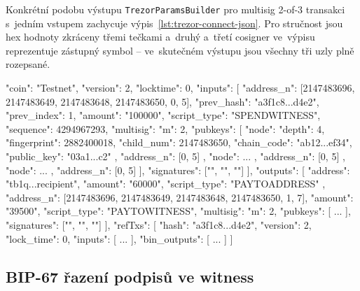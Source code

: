 Konkrétní podobu výstupu \texttt{TrezorParamsBuilder} pro multisig
2-of-3 transakci s~jedním vstupem zachycuje
výpis~\ref{lst:trezor-connect-json}. Pro stručnost jsou hex hodnoty
zkráceny třemi tečkami a~druhý a~třetí cosigner ve~výpisu reprezentuje
zástupný symbol -- ve~skutečném výstupu jsou všechny tři uzly plně
rozepsané.

\begin{listing}[htbp]
\begin{code}
{
  "coin": "Testnet",
  "version": 2,
  "locktime": 0,
  "inputs": [{
    "address_n": [2147483696, 2147483649, 2147483648,
                  2147483650, 0, 5],
    "prev_hash": "a3f1c8...d4e2",
    "prev_index": 1,
    "amount": "100000",
    "script_type": "SPENDWITNESS",
    "sequence": 4294967293,
    "multisig": {
      "m": 2,
      "pubkeys": [
        { "node": { "depth": 4,
                    "fingerprint": 2882400018,
                    "child_num": 2147483650,
                    "chain_code": "ab12...ef34",
                    "public_key": "03a1...c2" },
          "address_n": [0, 5] },
        { "node": { ... }, "address_n": [0, 5] },
        { "node": { ... }, "address_n": [0, 5] }
      ],
      "signatures": ["", "", ""]
    }
  }],
  "outputs": [
    { "address": "tb1q...recipient",
      "amount": "60000",
      "script_type": "PAYTOADDRESS" },
    { "address_n": [2147483696, 2147483649, 2147483648,
                    2147483650, 1, 7],
      "amount": "39500",
      "script_type": "PAYTOWITNESS",
      "multisig": { "m": 2, "pubkeys": [ ... ],
                    "signatures": ["", "", ""] } }
  ],
  "refTxs": [
    { "hash": "a3f1c8...d4e2", "version": 2, "lock_time": 0,
      "inputs": [ ... ], "bin_outputs": [ ... ] }
  ]
}
\end{code}
\caption[Příklad parametrů signTransaction v Trezor Connect]{Příklad
parametrů metody \texttt{signTransaction} v~Trezor Connect pro 2-of-3
multisig transakci s~jedním vstupem (cesta
\texttt{m/48'/1'/0'/2'/0/5}), platebním výstupem a~change výstupem
(cesta \texttt{m/48'/1'/0'/2'/1/7}). Pole \texttt{address\_n} obsahují
derivační cestu kódovanou jako \texttt{uint32}, hardened úrovně mají
nastaven bit \texttt{0x80000000}; \texttt{sequence} \texttt{0xFFFFFFFD}
signalizuje opt-in RBF dle BIP-125~\cite{BIP125}.}
\label{lst:trezor-connect-json}
\end{listing}

\subsection{BIP-67 řazení podpisů ve witness}

